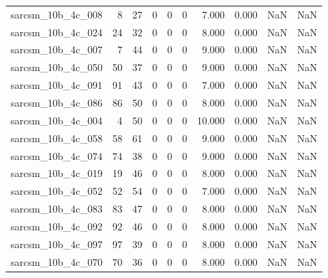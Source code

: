 \documentclass{article}
\begin{document}
\begin{longtable}{lrrrrrrrrr}
sarcsm\_10b\_4c\_008 & 8 & 27 & 0 & 0 & 0 & 7.000 & 0.000 & NaN & NaN \\
sarcsm\_10b\_4c\_024 & 24 & 32 & 0 & 0 & 0 & 8.000 & 0.000 & NaN & NaN \\
sarcsm\_10b\_4c\_007 & 7 & 44 & 0 & 0 & 0 & 9.000 & 0.000 & NaN & NaN \\
sarcsm\_10b\_4c\_050 & 50 & 37 & 0 & 0 & 0 & 9.000 & 0.000 & NaN & NaN \\
sarcsm\_10b\_4c\_091 & 91 & 43 & 0 & 0 & 0 & 7.000 & 0.000 & NaN & NaN \\
sarcsm\_10b\_4c\_086 & 86 & 50 & 0 & 0 & 0 & 8.000 & 0.000 & NaN & NaN \\
sarcsm\_10b\_4c\_004 & 4 & 50 & 0 & 0 & 0 & 10.000 & 0.000 & NaN & NaN \\
sarcsm\_10b\_4c\_058 & 58 & 61 & 0 & 0 & 0 & 9.000 & 0.000 & NaN & NaN \\
sarcsm\_10b\_4c\_074 & 74 & 38 & 0 & 0 & 0 & 9.000 & 0.000 & NaN & NaN \\
sarcsm\_10b\_4c\_019 & 19 & 46 & 0 & 0 & 0 & 8.000 & 0.000 & NaN & NaN \\
sarcsm\_10b\_4c\_052 & 52 & 54 & 0 & 0 & 0 & 7.000 & 0.000 & NaN & NaN \\
sarcsm\_10b\_4c\_083 & 83 & 47 & 0 & 0 & 0 & 8.000 & 0.000 & NaN & NaN \\
sarcsm\_10b\_4c\_092 & 92 & 46 & 0 & 0 & 0 & 8.000 & 0.000 & NaN & NaN \\
sarcsm\_10b\_4c\_097 & 97 & 39 & 0 & 0 & 0 & 8.000 & 0.000 & NaN & NaN \\
sarcsm\_10b\_4c\_070 & 70 & 36 & 0 & 0 & 0 & 8.000 & 0.000 & NaN & NaN \\
\end{longtable}
\end{document}

